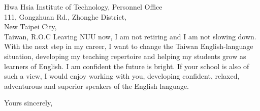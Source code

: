 \documentclass{letter}
\begin{document}
\begin{letter}{
Hwa Hsia Institute of Technology, Personnel Office \\ 111, Gongzhuan Rd., Zhonghe District, \\ New Taipei City, \\ Taiwan, R.O.C}
Leaving NUU now, I am not retiring and I am not slowing down. With the next step in my career, I want to change the Taiwan English-language situation, developing my teaching repertoire and helping my students grow as learners of English. I am confident the future is bright. If your school is also of such a view, I would enjoy working with you, developing confident, relaxed, adventurous and superior speakers of the English language.

\closing{Yours sincerely,}


\end{letter}
\end{document}
